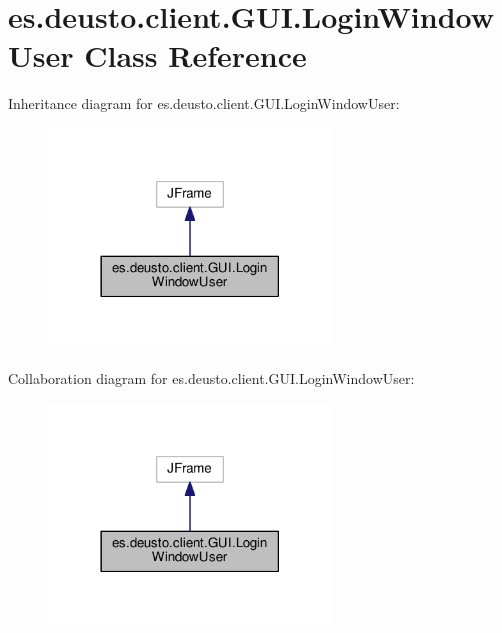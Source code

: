 \hypertarget{classes_1_1deusto_1_1client_1_1_g_u_i_1_1_login_window_user}{}\section{es.\+deusto.\+client.\+G\+U\+I.\+Login\+Window\+User Class Reference}
\label{classes_1_1deusto_1_1client_1_1_g_u_i_1_1_login_window_user}


Inheritance diagram for es.\+deusto.\+client.\+G\+U\+I.\+Login\+Window\+User\+:
\nopagebreak
\begin{figure}[H]
\begin{center}
\leavevmode
\includegraphics[width=213pt]{classes_1_1deusto_1_1client_1_1_g_u_i_1_1_login_window_user__inherit__graph}
\end{center}
\end{figure}


Collaboration diagram for es.\+deusto.\+client.\+G\+U\+I.\+Login\+Window\+User\+:
\nopagebreak
\begin{figure}[H]
\begin{center}
\leavevmode
\includegraphics[width=213pt]{classes_1_1deusto_1_1client_1_1_g_u_i_1_1_login_window_user__coll__graph}
\end{center}
\end{figure}
